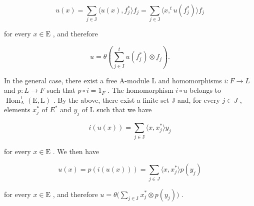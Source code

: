 \[
u (x) = \sum_ {j \in \mathrm{J}} \langle u (x), f _ {j} ^ {*} \rangle f _ {j} = \sum_ {j \in \mathrm{J}} \langle x, ^ {t} u (f _ {j} ^ {*}) \rangle f _ {j}\tag{1}
\]

for every \(x\in \mathrm{E}\) , and therefore

\[
u = \theta \left(\sum_ {j \in \mathrm{J}} ^ {t} u \left(f _ {j} ^ {*}\right) \otimes f _ {j}\right).\tag{2}
\]

In the general case, there exist a free A-module L and homomorphisms \(i: F \to L\) and \(p: L \to F\) such that \(p \circ i = 1_{F}\) . The homomorphism \(i \circ u\) belongs to \(\operatorname{Hom}_{\mathrm{A}}^{\mathrm{f}}(\mathrm{E}, \mathrm{L})\) . By the above, there exist a finite set J and, for every \(j \in J\) , elements \(x_{j}^{*}\) of \(E^{*}\) and \(y_{j}\) of L such that we have

\[
i (u (x)) = \sum_ {j \in \mathrm{J}} \langle x, x _ {j} ^ {*} \rangle y _ {j}
\]

for every \(x \in \mathrm{E}\) . We then have

\[
u (x) = p \left(i (u (x))\right) = \sum_ {j \in J} \langle x, x _ {j} ^ {*} \rangle p \left(y _ {j}\right)
\]

for every \(x \in \mathrm{E}\) , and therefore \(u = \theta\big(\sum_{j \in \mathrm{J}} x_j^* \otimes p(y_j)\big)\) .

